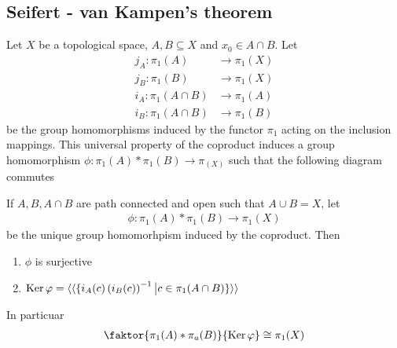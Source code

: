 \subsection{Seifert - van Kampen's theorem}

Let $X$ be a topological space, $A,B \subseteq X$ and $x_0 \in A \cap B$.
Let
\begin{align*}
  j_A: \pi_1(A) &\to \pi_1(X)\\
  j_B: \pi_1(B) &\to \pi_1(X)\\
  i_A: \pi_1(A\cap B) &\to \pi_1(A)\\
  i_B: \pi_1(A\cap B) &\to \pi_1(B)
\end{align*}
be the group homomorphisms induced by the functor $\pi_1$ acting on the inclusion mappings.
This universal property of the coproduct induces a group homomorphism
$\phi: \pi_1(A) \ast \pi_1(B) \to \pi_(X)$ such that the following diagram commutes
\begin{center}
\end{center}
\begin{thm}

If $A,B,A \cap B$ are path connected and open such that $A \cup B = X$, let
\begin{align*}
  \phi: \pi_1(A) \ast \pi_1(B) \to \pi_1(X)
\end{align*}
be the unique group homomorhpism induced by the coproduct. Then
\begin{enumerate}
  \item $\phi$ is surjective
  \item $\operatorname{Ker} \varphi = \langle\langle\{i_A(c)\left(
            i_B(c)
    \right)^{-1} \big\vert
    c \in \pi_1(A \cap B) 
    \}\rangle\rangle$
\end{enumerate}
In particuar
\begin{align*}
  \faktor{\pi_1(A) \ast \pi_a(B)}{\Ker \phi} \iso \pi_1(X)
\end{align*}
\end{thm}
